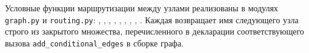 Условные функции маршрутизации между узлами реализованы в модулях \texttt{graph.py} и \texttt{routing.py}: , , , , , , , , . Каждая возвращает имя следующего узла строго из закрытого множества, перечисленного в декларации соответствующего вызова \texttt{add\_conditional\_edges} в сборке графа.
